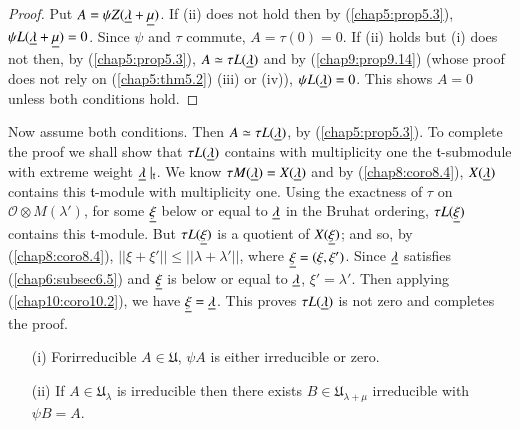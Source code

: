 \begin{proof}
Put $A = \psi Z(\underline{\lambda} + \underline{\mu})$. If (ii) does not hold then by
(\ref{chap5:prop5.3}), $\psi L(\underline{\lambda} + \underline{\mu}) = 0$. Since $\psi$ and $\tau$
commute, $A = \tau (0) = 0$. If (ii) holds but (i) does not then, by
(\ref{chap5:prop5.3}), $A \simeq \tau L(\underline{\lambda})$ and by
(\ref{chap9:prop9.14}) (whose proof does 
not rely on (\ref{chap5:thm5.2}) (iii) or (iv)), $\psi L(\underline{\lambda}) = 0$. This
shows $A =0$ unless both conditions hold. 
\end{proof}

Now assume both conditions. Then $A \simeq \tau L(\underline{\lambda})$, by
(\ref{chap5:prop5.3}). To complete the proof we shall show that $\tau L(\underline{\lambda})$
contains with multiplicity one the $\mathfrak{t}$-submodule with
extreme weight $\underline{\lambda}\mid_\mathfrak{t}$. We know $\tau
M(\underline{\lambda}) = X(\underline{\lambda})$ and by (\ref{chap8:coro8.4}), $X(\underline{\lambda})$
contains this $\mathfrak{t}$-module with multiplicity one. Using the
exactness of $\tau$ on $\mathscr{O} \otimes M(\lambda')$, for some
$\underline{\xi}$ below or equal to $\underline{\lambda}$ in the Bruhat ordering,
$\tau L(\underline{\xi})$ contains this $\mathfrak{t}$-module. But $\tau
L(\underline{\xi})$ is a quotient of $X(\underline{\xi})$; and so, by (\ref{chap8:coro8.4}), $||\xi +
\xi'|| \leq ||\lambda + \lambda'||$, where $\underline{\xi} = (\xi,
\xi')$. Since $\underline{\lambda}$ satisfies (\ref{chap6:subsec6.5}) and $\underline{\xi}$ is below or
equal to $\underline{\lambda}$, $\xi' =\lambda'$. Then applying (\ref{chap10:coro10.2}), we
have $\underline{\xi} = \underline{\lambda}$. This proves $\tau L(\underline{\lambda})$ is not
zero and completes the proof. 

\begin{prop}\label{chap10:prop10.10}
\begin{itemize}
\item[{\rm(i)}] For\pageoriginale irreducible $A \in \mathfrak{U}$, $\psi A$ is
  either irreduci\-ble or zero. 

\item[{\rm(ii)}] If $A \in \mathfrak{U}_\lambda$ is irreducible then
  there exists $B \in \mathfrak{U}_{\lambda+ \mu} $ irreducible with
  $\psi B = A$. 
\end{itemize}
\end{prop}


